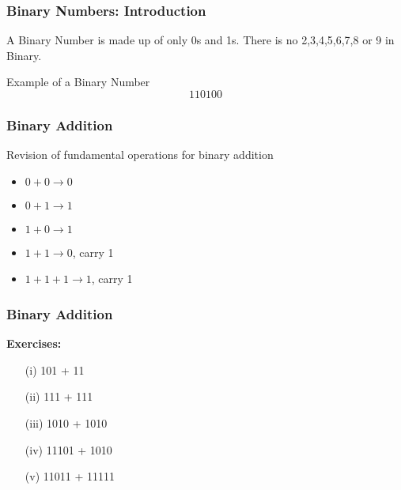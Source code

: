 \documentclass{beamer}
\begin{document}
\begin{frame}
\frametitle{Binary Numbers: Introduction}
A Binary Number is made up of only 0s and 1s. There is no 2,3,4,5,6,7,8 or 9 in Binary.

Example of a Binary Number
\[ 
110100\]

\end{frame}

\begin{frame}
\frametitle{Binary Addition}
\large
Revision of fundamental operations for binary addition

\begin{itemize}
\item $0 + 0 \rightarrow 0$
\item $0 + 1 \rightarrow 1$
\item $1 + 0 \rightarrow 1$
\item $1 + 1 \rightarrow 0$, carry 1 
\item $1 + 1 + 1 \rightarrow 1$, carry 1 
\end{itemize}
\end{frame}
\begin{frame}
\frametitle{Binary Addition}

\textbf{Exercises:}

\begin{itemize}
\item[(i)] 101 + 11 
\item[(ii)] 111 + 111 
\item[(iii)] 1010 + 1010 
\item[(iv)] 11101 + 1010 
\item[(v)] 11011 + 11111 
\end{itemize}
\end{frame}
\end{document}
